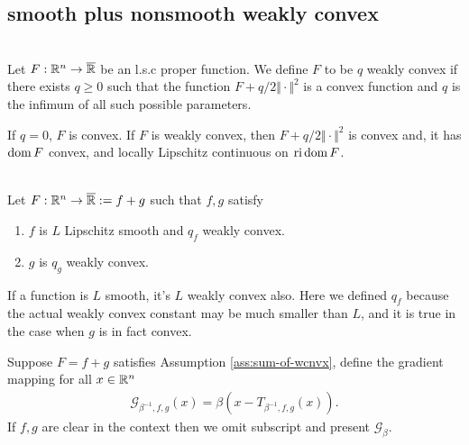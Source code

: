 \documentclass[12pt]{report}
\begin{document}
        \subsection{smooth plus nonsmooth weakly convex}
            \begin{definition}\;\label{def:wcnvx-fxn}\\
                Let $F: \mathbb R^n \rightarrow\overline {\mathbb R}$ be an l.s.c proper function. 
                We define $F$ to be $q$ weakly convex if there exists $q \ge 0$ such that the function $F + q/2\Vert \cdot\Vert^2$ is a convex function and $q$ is the infimum of all such possible parameters. 
            \end{definition}
            \begin{remark}
                If $q = 0$, $F$ is convex.
                If $F$ is weakly convex, then $F + q/2\Vert \cdot\Vert^2$ is convex and, it has $\operatorname{dom} F$ convex, and locally Lipschitz continuous on $\operatorname{ri} \operatorname{dom} F$. 
            \end{remark}
            \begin{assumption}\;\label{ass:sum-of-wcnvx}\\
                Let $F: \mathbb R^n \rightarrow \overline{\mathbb R}:= f + g$ such that $f, g$ satisfy 
                \begin{enumerate}
                    \item $f$ is $L$ Lipschitz smooth and $q_f$ weakly convex. 
                    \item $g$ is $q_g$ weakly convex. 
                \end{enumerate}
            \end{assumption}
            \begin{remark}
                If a function is $L$ smooth, it's $L$ weakly convex also. 
                Here we defined $q_f$ because the actual weakly convex constant may be much smaller than $L$, and it is true in the case when $g$ is in fact convex.  
            \end{remark}
            \begin{definition}\label{def:gm-for-ch2}
                Suppose $F = f + g$ satisfies Assumption \ref{ass:sum-of-wcnvx}, define the gradient mapping for all $x \in \mathbb R^n$
                \begin{align*}
                    \mathcal G_{\beta^{-1}, f, g}(x) = \beta(x - T_{\beta^{-1}, f, g}(x)). 
                \end{align*}
                If $f, g$ are clear in the context then we omit subscript and present $\mathcal G_\beta$. 
            \end{definition}
\end{document}
